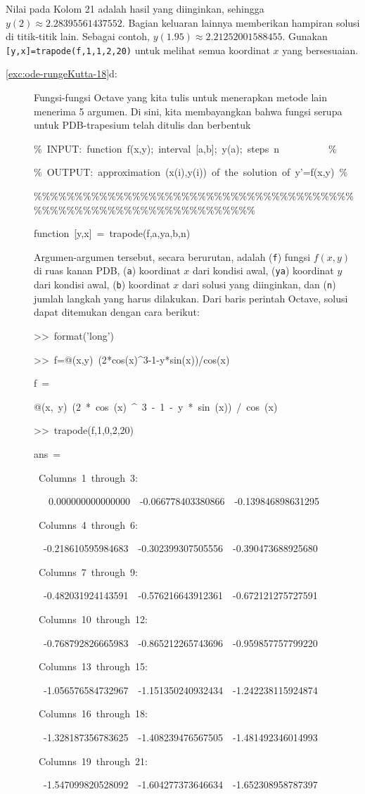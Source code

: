 Nilai pada Kolom 21 adalah hasil yang diinginkan, sehingga $y(2)\approx2.28395561437552$.
Bagian keluaran lainnya memberikan hampiran solusi di titik-titik
lain. Sebagai contoh, $y(1.95)\approx2.21252001588455$. Gunakan \texttt{{[}y,x{]}=trapode(f,1,1,2,20)}
untuk melihat semua koordinat $x$ yang bersesuaian.
\begin{description}
\item [{\ref{exc:ode-rungeKutta-18}d:}] Fungsi-fungsi Octave yang kita
tulis untuk menerapkan metode lain menerima 5 argumen. Di sini, kita
membayangkan bahwa fungsi serupa untuk PDB-trapesium telah ditulis
dan berbentuk

\begin{lyxcode}
\%~INPUT:~function~f(x,y);~interval~{[}a,b{]};~y(a);~steps~n~~~~~~~~~~\%

\%~OUTPUT:~approximation~(x(i),y(i))~of~the~solution~of~y'=f(x,y)~\%

\%\%\%\%\%\%\%\%\%\%\%\%\%\%\%\%\%\%\%\%\%\%\%\%\%\%\%\%\%\%\%\%\%\%\%\%\%\%\%\%\%\%\%\%\%\%\%\%\%\%\%\%\%\%\%\%\%\%\%\%\%\%\%\%\%\%

function~{[}y,x{]}~=~trapode(f,a,ya,b,n)~
\end{lyxcode}
Argumen-argumen tersebut, secara berurutan, adalah (\texttt{f}) fungsi
$f(x,y)$ di ruas kanan PDB, (\texttt{a}) koordinat $x$ dari kondisi
awal, (\texttt{ya}) koordinat $y$ dari kondisi awal, (\texttt{b})
koordinat $x$ dari solusi yang diinginkan, dan (\texttt{n}) jumlah
langkah yang harus dilakukan. Dari baris perintah Octave, solusi dapat
ditemukan dengan cara berikut:
\begin{lyxcode}
>\textcompwordmark >~format('long')

>\textcompwordmark >~f=@(x,y)~(2{*}cos(x)\textasciicircum 3-1-y{*}sin(x))/cos(x)

f~=

@(x,~y)~(2~{*}~cos~(x)~\textasciicircum ~3~-~1~-~y~{*}~sin~(x))~/~cos~(x)

>\textcompwordmark >~trapode(f,1,0,2,20)

ans~=

~Columns~1~through~3:

~~~0.000000000000000~~-0.066778403380866~~-0.139846898631295

~Columns~4~through~6:

~~-0.218610595984683~~-0.302399307505556~~-0.390473688925680

~Columns~7~through~9:

~~-0.482031924143591~~-0.576216643912361~~-0.672121275727591

~Columns~10~through~12:

~~-0.768792826665983~~-0.865212265743696~~-0.959857757799220

~Columns~13~through~15:

~~-1.056576584732967~~-1.151350240932434~~-1.242238115924874

~Columns~16~through~18:

~~-1.328187356783625~~-1.408239476567505~~-1.481492346014993

~Columns~19~through~21:

~~-1.547099820528092~~-1.604277373646634~~-1.652308958787397
\end{lyxcode}
\end{description}
